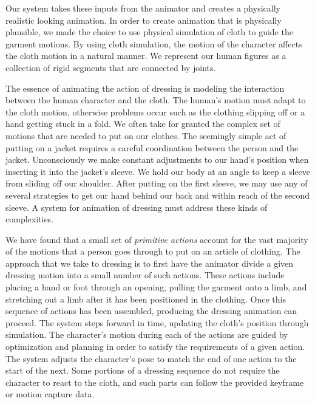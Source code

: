 Our system takes these inputs from the animator and creates a physically
realistic looking animation.  In order to create animation that is
physically plausible, we made the choice to use physical simulation of
cloth to guide the garment motions.  By using cloth simulation, the motion
of the character affects the cloth motion in a natural manner.  We
represent our human figures as a collection of rigid segments that are
connected by joints.


The essence of animating the action of dressing is modeling the
interaction between the human character and the cloth.  The human's motion
must adapt to the cloth motion, otherwise problems occur such as the
clothing slipping off or a hand getting stuck in a fold.  We often take
for granted the complex set of motions that are needed to put on our
clothes.  The seemingly simple act of putting on a jacket requires a
careful coordination between the person and the jacket.  Unconsciously we
make constant adjustments to our hand’s position when inserting it into
the jacket’s sleeve.  We hold our body at an angle to keep a sleeve from
sliding off our shoulder.  After putting on the first sleeve, we may use
any of several strategies to get our hand behind our back and within reach
of the second sleeve.  A system for animation of dressing must address
these kinds of complexities.

We have found that a small set of \emph{primitive actions} account for the vast
majority of the motions that a person goes through to put on an article of
clothing.  The approach that we take to dressing is to first have the
animator divide a given dressing motion into a small number of such
actions.  These actions include placing a hand or foot through an opening,
pulling the garment onto a limb, and stretching out a limb after it has
been positioned in the clothing.  Once this sequence of actions has been
assembled, producing the dressing animation can proceed.  The system steps
forward in time, updating the cloth's position through simulation.  The
character's motion during each of the actions are guided by optimization
and planning in order to satisfy the requirements of a given
action.  The system adjusts the character's pose to match the end of one
action to the start of the next.  Some portions of a dressing sequence do
not require the character to react to the cloth, and such parts can follow
the provided keyframe or motion capture data.

